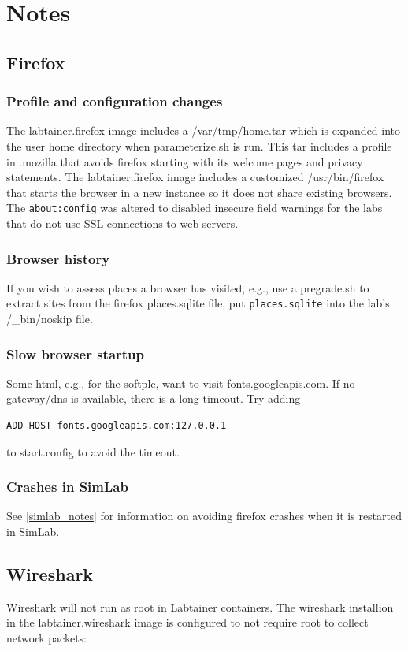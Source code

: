 \documentclass[12pt]{article}
\begin{document}
\section{Notes} \label{Notes}
\label{Notes}
\subsection{Firefox}
\subsubsection{Profile and configuration changes}
The labtainer.firefox image includes a /var/tmp/home.tar 
which is expanded into the user home directory when parameterize.sh is run.
This tar includes a profile in .mozilla that avoids firefox starting with its 
welcome pages and privacy statements.  The labtainer.firefox image includes a 
customized /usr/bin/firefox that starts the browser in a new instance so it does 
not share existing browsers.  The {\tt about:config}
was altered to disabled insecure field warnings for the labs that do not use SSL connections to web servers.

\subsubsection{Browser history}
If you wish to assess places a browser has visited, e.g., use a pregrade.sh to extract sites from the
firefox places.sqlite file, put {\tt places.sqlite} into the lab's /\_bin/noskip file.

\subsubsection{Slow browser startup}
Some html, e.g., for the softplc, want to visit fonts.googleapis.com.  If no gateway/dns is available, there is a long timeout.
Try adding 
\begin{verbatim}
ADD-HOST fonts.googleapis.com:127.0.0.1 
\end{verbatim}
\noindent to start.config to avoid the timeout.

\subsubsection{Crashes in SimLab}
See \ref{simlab_notes} for information on avoiding firefox crashes when it is restarted in SimLab.

\subsection{Wireshark}
Wireshark will not run as root in Labtainer containers.  
The wireshark installion in the labtainer.wireshark image is configured to not
require root to collect network packets:
\end{document}
